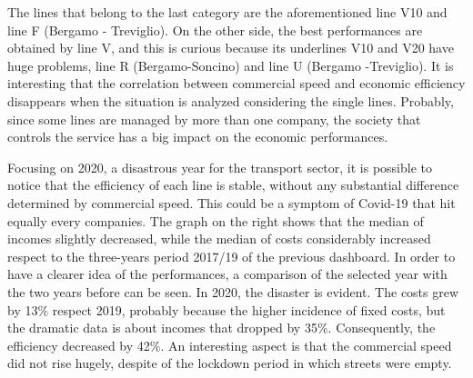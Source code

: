 The lines that belong to the last category are the aforementioned line V10 and line F (Bergamo - Treviglio). 
On the other side, the best performances are obtained by line V, and this is curious because its underlines V10 and V20 have huge problems, line R (Bergamo-Soncino) and line U (Bergamo -Treviglio). 
It is interesting that the correlation between commercial speed and economic efficiency disappears when the situation is analyzed considering the single lines. Probably, since some lines are managed by more than one company, the society that controls the service has a big impact on the economic performances.

Focusing on 2020, a disastrous year for the transport sector, it is possible to notice that the efficiency of each line is stable, without any substantial difference determined by commercial speed. This could be a symptom of Covid-19 that hit equally every companies. The graph on the right shows that the median of incomes slightly decreased, while the median of costs considerably increased respect to the three-years period 2017/19 of the previous dashboard. In order to have a clearer idea of the performances, a comparison of the selected year with the two years before can be seen. In 2020, the disaster is evident. The costs grew by 13$\%$ respect 2019, probably because the higher incidence of fixed costs, but the dramatic data is about incomes that dropped by 35$\%$. Consequently, the efficiency decreased by 42$\%$. An interesting aspect is that the commercial speed did not rise hugely, despite of the lockdown period in which streets were empty. 



\newpage
\begin{landscape}
\thispagestyle{empty}

\end{landscape}
\newpage


\newpage
\begin{landscape}
\thispagestyle{empty}

\end{landscape}
\newpage
\begin{landscape}
\thispagestyle{empty}

\end{landscape}

